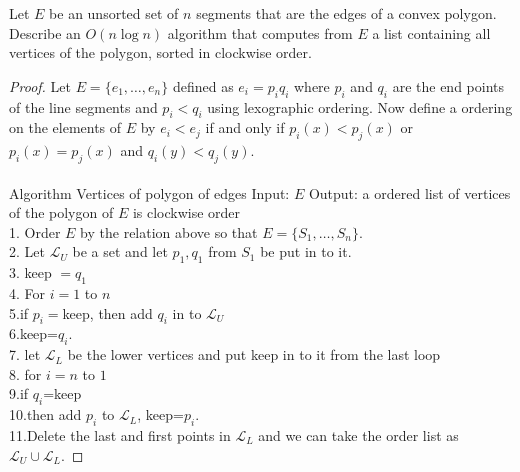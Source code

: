 \documentclass[12pt]{article}
\newcommand{\0}{\{0\}}
\newenvironment{proposition}[2][Proposition]{\begin{trivlist}
\item[\hspace \labelsep {\bfseries #1}\hspace \labelsep {\bfseries #2:}]}{\end{trivlist}}
\begin{document}
	\begin{proposition}\\
		Let $E$ be an unsorted set of $n$ segments that are the edges of a convex polygon.  Describe an $O(n \log n)$ algorithm that computes from $E$ a list containing all vertices of the polygon, sorted in clockwise order.
	\end{proposition}
	\begin{proof}
	Let $E=\{e_1,\dots, e_n\}$ defined as $e_i=p_iq_i$ where $p_i$ and $q_i$ are the end points of the line segments and $p_i<q_i$ using lexographic ordering.  Now define a ordering on the elements of $E$ by $e_i<e_j$ if and only if $p_i(x)<p_j(x)$ or $p_i(x)=p_j(x)$ and $q_i(y)<q_j(y)$. 
	\\
	\\
	\indent Algorithm Vertices of polygon of edges
	Input: $E$
	Output: a ordered list of vertices of the polygon of $E$ is clockwise order
	\\
	1. Order $E$ by the relation above so that $E=\{S_1,\dots, S_n\}$.
	\\
	2. Let $\mathcal{L}_U$ be a set and let $p_1,q_1$ from $S_1$ be put in to it.
	\\
	3. keep $=q_1$
	\\
	4. For $i=1$ to $n$
	\\
	5.\indent if $p_i=$keep, then add $q_i$ in to $\mathcal{L}_U$
	\\
	6.\indent\indent keep=$q_i$.
	\\
	7. let $\mathcal{L}_L$ be the lower vertices and put keep in to it from the last loop
	\\
	8. for $i=n$ to $1$
	\\
	9.\indent if $q_i$=keep
	\\
	10.\indent \indent then add $p_i$ to $\mathcal{L}_L$, keep=$p_i$.
	\\
	11.Delete the last and first points in $\mathcal{L}_L$ and we can take the order list as $\mathcal{L}_U\cup \mathcal{L}_L$.
	\end{proof}
\end{document}
